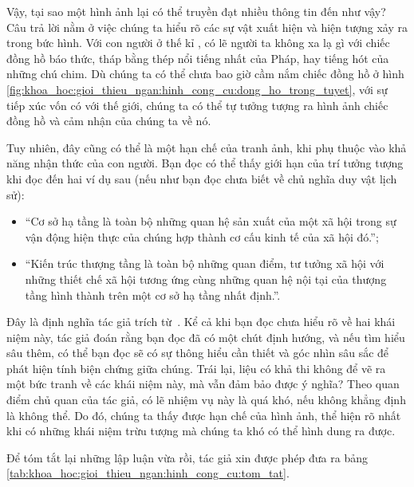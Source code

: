 Vậy, tại sao một hình ảnh lại có thể truyền đạt nhiều thông tin đến như vậy? Câu trả lời nằm ở việc chúng ta hiểu rõ các sự vật xuất hiện và hiện tượng xảy ra trong bức hình. Với con người ở thế kỉ , có lẽ người ta không xa lạ gì với chiếc đồng hồ báo thức, tháp bằng thép nổi tiếng nhất của Pháp, hay tiếng hót của những chú chim. Dù chúng ta có thể chưa bao giờ cầm nắm chiếc đồng hồ ở hình \ref{fig:khoa_hoc:gioi_thieu_ngan:hinh_cong_cu:dong_ho_trong_tuyet}, với sự tiếp xúc vốn có với thế giới, chúng ta có thể tự tưởng tượng ra hình ảnh chiếc đồng hồ và cảm nhận của chúng ta về nó.

Tuy nhiên, đây cũng có thể là một hạn chế của tranh ảnh, khi phụ thuộc vào khả năng nhận thức của con người. Bạn đọc có thể thấy giới hạn của trí tưởng tượng khi đọc đến hai ví dụ sau (nếu như bạn đọc chưa biết về chủ nghĩa duy vật lịch sử):
\begin{itemize}
   \item ``Cơ sở hạ tầng là toàn bộ những quan hệ sản xuất của một xã hội trong sự vận động hiện thực của chúng hợp thành cơ cấu kinh tế của xã hội đó.'';
   \item ``Kiến trúc thượng tầng là toàn bộ những quan điểm, tư tưởng xã hội với những thiết chế xã hội tương ứng cùng những quan hệ nội tại của thượng tầng hình thành trên một cơ sở hạ tầng nhất định.''.
\end{itemize}
Đây là định nghĩa tác giả trích từ~\cite{djc2024giao}. Kể cả khi bạn đọc chưa hiểu rõ về hai khái niệm này, tác giả đoán rằng bạn đọc đã có một chút định hướng, và nếu tìm hiểu sâu thêm, có thể bạn đọc sẽ có sự thông hiểu cần thiết và góc nhìn sâu sắc để phát hiện tính biện chứng giữa chúng. Trái lại, liệu có khả thi không để vẽ ra một bức tranh về các khái niệm này, mà vẫn đảm bảo được ý nghĩa? Theo quan điểm chủ quan của tác giả, có lẽ nhiệm vụ này là quá khó, nếu không khẳng định là không thể. Do đó, chúng ta thấy được hạn chế của hình ảnh, thể hiện rõ nhất khi có những khái niệm trừu tượng mà chúng ta khó có thể hình dung ra được. 

Để tóm tắt lại những lập luận vừa rồi, tác giả xin được phép đưa ra bảng \ref{tab:khoa_hoc:gioi_thieu_ngan:hinh_cong_cu:tom_tat}.


